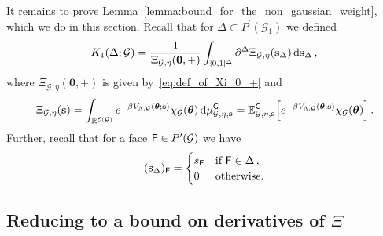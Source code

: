 \documentclass[11pt]{article}
\theoremstyle{definition}
\theoremstyle{remark}
\numberwithin{theorem}{section}
\newcommand{\bR}{\mathbb R}
\newcommand{\bE}{\mathbb E}
\newcommand{\cE}{\mathcal{E}}
\newcommand{\cG}{\mathcal G}
\begin{document}
    It remains to prove Lemma~\ref{lemma:bound_for_the_non_gaussian_weight}, which we do in this section. Recall that for $\Delta \subset P^\prime(\mathcal{G}_1)$ we defined
    \begin{equation*}
        K_1(\Delta;\mathcal{G}) = \frac{1}{\Xi_{\mathcal{G},\eta}(\mathbf{0},+)} \int_{[0,1]^\Delta} \partial^\Delta \Xi_{\mathcal{G},\eta}(\mathbf{s}_{\Delta}) \, {\rm d} \mathbf{s}_\Delta \, ,
    \end{equation*}
    where $\Xi_{\mathcal{G},\eta}(\mathbf{0},+)$ is given by~\eqref{eq:def_of_Xi_0_+} and 
    \begin{equation*}
    \Xi_{\mathcal{G},\eta}(\mathbf{s}) = \int_{\bR^{\cE(\mathcal{G})}} e^{-\beta V_{\Lambda,\mathcal{G}}(\boldsymbol{\theta};\mathbf{s})} \chi_{\mathcal{G}}(\boldsymbol{\theta}) \, {\rm d}\mu_{\mathcal{G},\eta,\mathbf{s}}^{\sf G}  =  \bE_{\mathcal{G},\eta,\mathbf{s}}^{\sf G} \Big[ e^{-\beta V_{\Lambda,\mathcal{G}}(\boldsymbol{\theta};\mathbf{s})} \chi_{\mathcal{G}}(\boldsymbol{\theta})  \Big] \, .
    \end{equation*}
     Further, recall that for a face ${\sf F}\in P^\prime(\cG)$ we have 
     \begin{equation*}
         (\mathbf{s}_\Delta)_{\sf{F}} = \begin{cases}
             s_{\sf F} & \text{if} \ {\sf F} \in \Delta  \, , \\ 0 & \text{otherwise.}
         \end{cases}
     \end{equation*}
    
    \subsection{Reducing to a bound on derivatives of $\Xi$}
    
\end{document}
